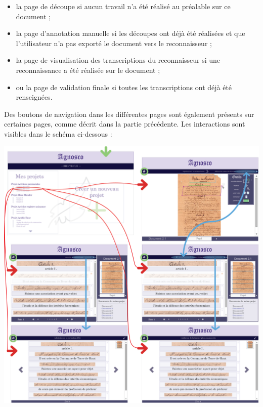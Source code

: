 \begin{itemize}
\item la page de découpe si aucun travail n’a été réalisé au préalable sur ce document ;
\item la page d’annotation manuelle si les découpes ont déjà été réalisées et que l’utilisateur n’a pas exporté le document vers le reconnaisseur ;
\item la page de visualisation des transcriptions du reconnaisseur si une reconnaissance a été réalisée sur le document ;
\item ou la page de validation finale si toutes les transcriptions ont déjà été renseignées.
\end{itemize}

Des boutons de navigation dans les différentes pages sont également présents sur certaines pages, comme décrit dans la partie précédente. Les interactions sont visibles dans le schéma ci-dessous :

\begin{mdframed}[frametitle={Figure 7 : Schéma des interactions entre les différents composants de l'IHM}, innerbottommargin=10]
\begin{center}
\includegraphics[scale=0.5]{assets/schemaIHMinteractions.png}
\end{center}
\end{mdframed}
